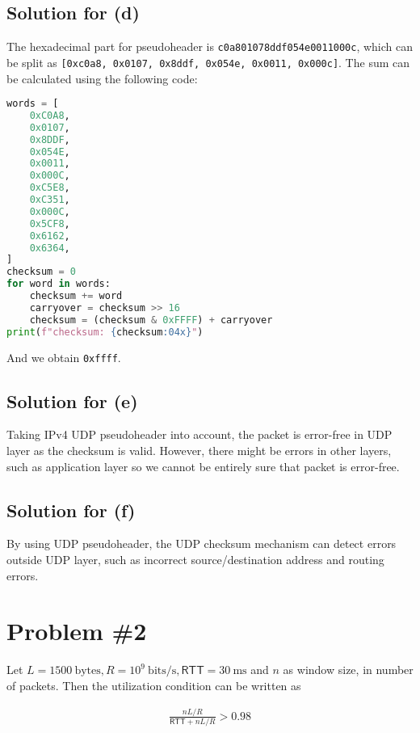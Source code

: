 \documentclass{scrartcl}
\newcommand{\un}[1]{\ensuremath{\ \mathrm{#1}}}
\begin{document}
\subsection{Solution for (d)}

The hexadecimal part for pseudoheader is \texttt{c0a801078ddf054e0011000c},
which can be split as \texttt{[0xc0a8, 0x0107, 0x8ddf, 0x054e, 0x0011, 0x000c]}.
The sum can be calculated using the following code:

\begin{lstlisting}[language=Python]
words = [
    0xC0A8,
    0x0107,
    0x8DDF,
    0x054E,
    0x0011,
    0x000C,
    0xC5E8,
    0xC351,
    0x000C,
    0x5CF8,
    0x6162,
    0x6364,
]
checksum = 0
for word in words:
    checksum += word
    carryover = checksum >> 16
    checksum = (checksum & 0xFFFF) + carryover
print(f"checksum: {checksum:04x}")
\end{lstlisting}

And we obtain \texttt{0xffff}.

\subsection{Solution for (e)}

Taking IPv4 UDP pseudoheader into account, the packet is error-free in
UDP layer as the checksum is valid. However, there might be errors in other
layers, such as application layer so we cannot be entirely sure that packet
is error-free.

\subsection{Solution for (f)}

By using UDP pseudoheader, the UDP checksum mechanism can detect errors outside
UDP layer, such as incorrect source/destination address and routing errors.

\section{Problem \#2}

Let \(L = 1500 \un{bytes}, R = 10^9 \un{bits/s}, \mathsf{RTT} = 30 \un{ms}\) and
\(n\) as window size, in number of packets. Then the utilization condition can
be written as

\begin{align*}
\frac{nL / R}{\mathsf{RTT} + nL / R} > 0.98
\end{align*}
\end{document}
